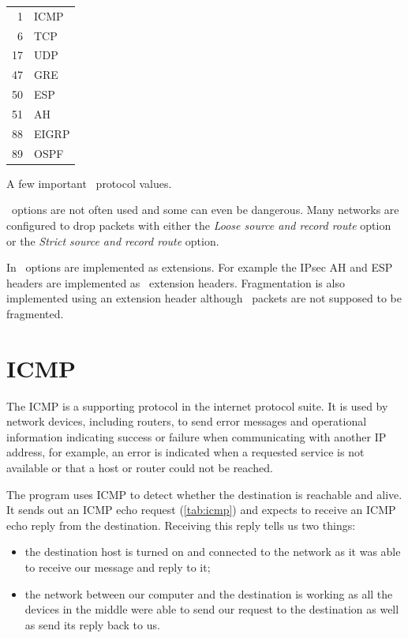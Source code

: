 \begin{margintable}
\begin{tabular}{rl}
 1 & \acs{ICMP}  \\
 6 & \acs{TCP}   \\
17 & \acs{UDP}   \\
47 & \acs{GRE}   \\
50 & \acs{ESP}   \\
51 & \acs{AH}    \\
88 & \acs{EIGRP} \\
89 & \acs{OSPF}  \\
\end{tabular}
\caption{A few important \IP\ protocol values.}
\end{margintable}

\IPfour\ options are not often used and some can even be dangerous.
Many networks are configured to drop packets with either the \emph{Loose source and record route} option or the \emph{Strict source and record route} option.

In \IPsix\ options are implemented as extensions.
For example the IPsec \acf{AH} and \acf{ESP} headers are implemented as \IPsix\ extension headers.
Fragmentation is also implemented using an extension header although \IPsix\ packets are not supposed to be fragmented.





\section{\Acl{ICMP}}
\label{sec:ip-icmp}

The \acf{ICMP} is a supporting protocol in the internet protocol suite.
It is used by network devices, including routers, to send error messages and operational information indicating success or failure when communicating with another \acs{IP} address, for example, an error is indicated when a requested service is not available or that a host or router could not be reached.

The program  uses \acs{ICMP} to detect whether the destination is reachable and alive.
It sends out an \acs{ICMP} echo request (\cref{tab:icmp}) and expects to receive an \acs{ICMP} echo reply from the destination.
Receiving this reply tells us two things:
\begin{itemize}
\item
   the destination host is turned on and connected to the network as it was able to receive our message and reply to it;
\item
   the network between our computer and the destination is working as all the devices in the middle were able to send our request to the destination as well as send its reply back to us.
\end{itemize}

